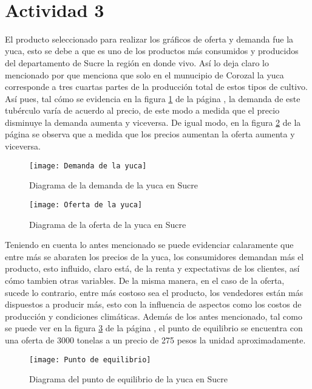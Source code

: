 \justify
\fontsize{12pt}{14}\
\setlength{\parindent}{0cm}

\section{Actividad 3}
\normalsize El producto seleccionado para realizar los gráficos de oferta y demanda fue la yuca, esto se debe a que es uno de los productos más consumidos y producidos del departamento de Sucre la región en donde vivo. Así lo deja claro lo mencionado por \cite{hochschild2024} que menciona que solo en el munucipio de Corozal la yuca corresponde a tres cuartas partes de la producción total de estos tipos de cultivo. Así pues, tal cómo se evidencia en la figura \ref{fig:demanda} de la página \pageref{fig:demanda}, la demanda de este tubérculo varía de acuerdo al precio, de este modo a medida que el precio disminuye la demanda aumenta y viceversa. De igual modo, en la figura \ref{fig:oferta} de la página \pageref{fig:oferta} se observa que a medida que los precios aumentan la oferta aumenta y viceversa.

\begin{figure}[H]
    \centering
    \texttt{[image: Demanda de la yuca]}
    \caption{Diagrama de la demanda de la yuca en Sucre}
    \label{fig:demanda}
\end{figure}

\begin{figure}[H]
    \centering
    \texttt{[image: Oferta de la yuca]}
    \caption{Diagrama de la oferta de la yuca en Sucre}
    \label{fig:oferta}
\end{figure}

\normalsize Teniendo en cuenta lo antes mencionado se puede evidenciar calaramente que entre más se abaraten los precios de la yuca, los consumidores demandan más el producto, esto influido, claro está, de la renta y expectativas de los clientes, así cómo tambien otras variables. De la misma manera, en el caso de la oferta, sucede lo contrario, entre más costoso sea el producto, los vendedores están más dispuestos a producir más, esto con la influencia de aspectos como los costos de producción y condiciones climáticas. Además de los antes mencionado, tal como se puede ver en la figura \ref{fig:equilibrio} de la página \pageref{fig:equilibrio}, el punto de equilibrio se encuentra con una oferta de 3000 tonelas a un precio de 275 pesos la unidad aproximadamente.

\begin{figure}[H]
    \centering
    \texttt{[image: Punto de equilibrio]}
    \caption{Diagrama del punto de equilibrio de la yuca en Sucre}
    \label{fig:equilibrio}
\end{figure}